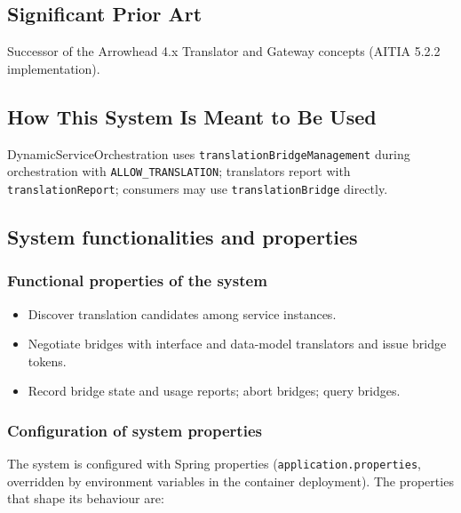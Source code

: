 \documentclass[a4paper]{arrowhead}
\begin{document}
\newpage

\subsection{Significant Prior Art}
\label{sec:prior_art}

Successor of the Arrowhead 4.x Translator and Gateway concepts (AITIA 5.2.2 implementation).

\subsection{How This System Is Meant to Be Used}
\label{sec:use}

Dynamic\allowbreak{}Service\allowbreak{}Orchestration uses \texttt{translation\allowbreak{}Bridge\allowbreak{}Management} during orchestration with \texttt{ALLOW\_\allowbreak{}TRANSLATION}; translators report with \texttt{translationReport}; consumers may use \texttt{translationBridge} directly.

\subsection{System functionalities and properties}
\label{sec:properties}

\subsubsection{Functional properties of the system}

\begin{itemize}
  \item Discover translation candidates among service instances.
  \item Negotiate bridges with interface and data-model translators and issue bridge tokens.
  \item Record bridge state and usage reports; abort bridges; query bridges.
\end{itemize}

\subsubsection{Configuration of system properties}

The system is configured with Spring properties (\texttt{application.properties}, overridden by environment variables in the container deployment). The properties that shape its behaviour are:
\end{document}
